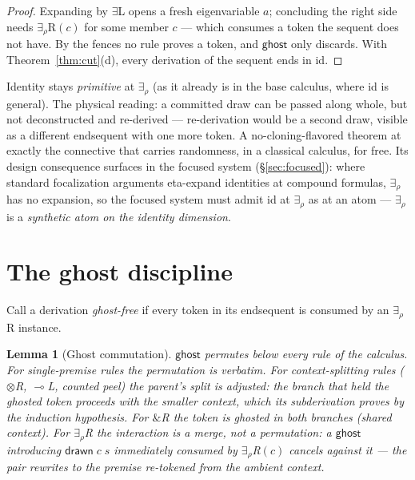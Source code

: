 \documentclass[11pt]{article}
\newcommand{\loli}{\multimap}                    %
\newcommand{\tensor}{\otimes}                    %
\newcommand{\addconj}{\mathbin{\&}}              %
\newcommand{\dtok}[2]{\mathsf{drawn}\;#1\;#2}      %
\newcommand{\ghost}{\mathsf{ghost}}
\newtheorem{lemma}[theorem]{Lemma}
\theoremstyle{definition}
\theoremstyle{remark}
\begin{document}
\begin{proof}
Expanding by $\exists$L opens a fresh eigenvariable $a$; concluding the
right side needs $\exists_\rho$R$(c)$ for some member $c$ --- which
consumes a token the sequent does not have.  By the fences no rule
proves a token, and $\ghost$ only discards.  With
Theorem~\ref{thm:cut}(d), every derivation of the sequent ends in id.
\end{proof}

Identity stays \emph{primitive} at $\exists_\rho$ (as it already is in
the base calculus, where id is general).  The physical reading: a
committed draw can be passed along whole, but not deconstructed and
re-derived --- re-derivation would be a second draw, visible as a
different endsequent with one more token.  A no-cloning-flavored
theorem at exactly the connective that carries randomness, in a
classical calculus, for free.  Its design consequence surfaces in the
focused system (\S\ref{sec:focused}): where standard focalization
arguments eta-expand identities at compound formulas, $\exists_\rho$
has no expansion, so the focused system must admit id at
$\exists_\rho$ as at an atom --- $\exists_\rho$ is a \emph{synthetic
atom on the identity dimension}.

\section{The ghost discipline}
\label{sec:ghost}

Call a derivation \emph{ghost-free} if every token in its endsequent is
consumed by an $\exists_\rho$R instance.

\begin{lemma}[Ghost commutation]\label{lem:ghostcomm}
$\ghost$ permutes below every rule of the calculus.  For
single-premise rules the permutation is verbatim.  For
context-splitting rules ($\tensor$R, $\loli$L, counted peel) the
parent's split is adjusted: the branch that held the ghosted token
proceeds with the smaller context, which its subderivation proves by
the induction hypothesis.  For $\addconj$R the token is ghosted in both
branches (shared context).  For $\exists_\rho$R the interaction is a
\emph{merge}, not a permutation: a $\ghost$ introducing $\dtok{c}{s}$
immediately consumed by $\exists_\rho$R$(c)$ cancels against it --- the
pair rewrites to the premise re-tokened from the ambient context.
\end{lemma}
\end{document}
